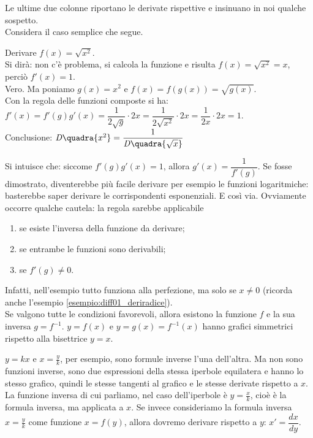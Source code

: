 Le ultime due colonne riportano le derivate rispettive e insinuano in
noi qualche sospetto.\\
Considera il caso semplice che segue.
\begin{esempio}
  Derivare $f(x)=\sqrt{x^2}$.\\
  Si dirà: non c'è problema, si calcola la funzione e risulta 
  $f(x)=\sqrt{x^2}=x$, perciò  $f'(x)=1$. \\
  Vero. Ma poniamo $g(x)=x^2$ e $f(x)=f(g(x))=\sqrt{g(x)}$.\\
  Con la regola delle funzioni composte si ha:\\ 
  $f'(x)=f'(g)g'(x)= \dfrac{1}{2\sqrt{g}}\cdot 2x=
  \dfrac{1}{2\sqrt{x^2}}\cdot 2x=\dfrac{1}{2x}\cdot 2x=1$.\\
  Conclusione: $\mathit{D}\quadra{x^2}=\dfrac{1}{\mathit{D}\quadra{\sqrt{x}}}$
\end{esempio}
Si intuisce che: siccome $f'(g)g'(x)=1$, allora $g'(x)=\dfrac{1}{f'(g)}$.
Se fosse dimostrato, diventerebbe più facile derivare per esempio le funzioni 
logaritmiche: basterebbe saper derivare le corrispondenti esponenziali. E così
via. Ovviamente occorre qualche cautela: la regola sarebbe applicabile
 \begin{enumerate} [noitemsep]
  \item se esiste l'inversa della funzione da derivare;
  \item se entrambe le funzioni sono derivabili;
  \item se  $f'(g)\ne 0$.
 \end{enumerate}
Infatti, nell'esempio tutto funziona alla perfezione, ma solo se $x\ne0$
(ricorda anche l'esempio \ref{esempio:diff01_deriradice}). \\
Se valgono tutte le condizioni favorevoli, allora esistono la funzione
$f$ e la sua inversa $g=f^{-1}$. $y=f(x)$ e $y=g(x)=f^{-1}(x)$ hanno grafici 
simmetrici rispetto alla bisettrice $y=x$.
\begin{osservazione}
 $y=kx$ e $x=\frac{y}{k}$, per esempio, sono formule inverse l'una 
 dell'altra. Ma non sono funzioni inverse, sono due espressioni della stessa 
 iperbole equilatera e hanno lo stesso grafico, quindi le stesse tangenti al
 grafico e le stesse derivate rispetto a $x$.\\ La funzione inversa di cui 
 parliamo, nel caso dell'iperbole è $y=\frac{x}{k}$, cioè è la formula inversa,
 ma applicata a $x$. Se invece consideriamo la formula inversa $x=\frac{y}{k}$
 come funzione $x=f(y)$, allora dovremo derivare rispetto a $y$: 
 $x'=\dfrac{dx}{dy}$.
\end{osservazione}


